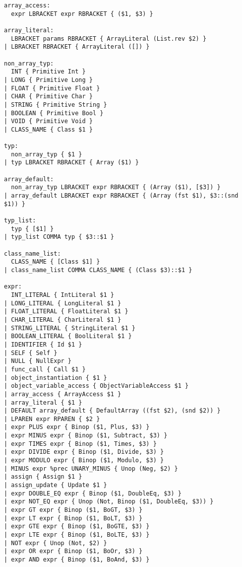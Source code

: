 \documentclass{article}
\begin{document}
\begin{verbatim}
array_access:
  expr LBRACKET expr RBRACKET { ($1, $3) }

array_literal:
  LBRACKET params RBRACKET { ArrayLiteral (List.rev $2) }
| LBRACKET RBRACKET { ArrayLiteral ([]) }

non_array_typ:
  INT { Primitive Int }
| LONG { Primitive Long }
| FLOAT { Primitive Float }
| CHAR { Primitive Char }
| STRING { Primitive String }
| BOOLEAN { Primitive Bool }
| VOID { Primitive Void }
| CLASS_NAME { Class $1 }

typ:
  non_array_typ { $1 }
| typ LBRACKET RBRACKET { Array ($1) }

array_default:
  non_array_typ LBRACKET expr RBRACKET { (Array ($1), [$3]) }
| array_default LBRACKET expr RBRACKET { (Array (fst $1), $3::(snd $1)) }

typ_list:
  typ { [$1] }
| typ_list COMMA typ { $3::$1 }

class_name_list:
  CLASS_NAME { [Class $1] }
| class_name_list COMMA CLASS_NAME { (Class $3)::$1 }

expr:
  INT_LITERAL { IntLiteral $1 }
| LONG_LITERAL { LongLiteral $1 }
| FLOAT_LITERAL { FloatLiteral $1 }
| CHAR_LITERAL { CharLiteral $1 }
| STRING_LITERAL { StringLiteral $1 }
| BOOLEAN_LITERAL { BoolLiteral $1 }
| IDENTIFIER { Id $1 }
| SELF { Self }
| NULL { NullExpr }
| func_call { Call $1 }
| object_instantiation { $1 }
| object_variable_access { ObjectVariableAccess $1 }
| array_access { ArrayAccess $1 }
| array_literal { $1 }
| DEFAULT array_default { DefaultArray ((fst $2), (snd $2)) }
| LPAREN expr RPAREN { $2 }
| expr PLUS expr { Binop ($1, Plus, $3) }
| expr MINUS expr { Binop ($1, Subtract, $3) }
| expr TIMES expr { Binop ($1, Times, $3) }
| expr DIVIDE expr { Binop ($1, Divide, $3) }
| expr MODULO expr { Binop ($1, Modulo, $3) }
| MINUS expr %prec UNARY_MINUS { Unop (Neg, $2) }
| assign { Assign $1 }
| assign_update { Update $1 }
| expr DOUBLE_EQ expr { Binop ($1, DoubleEq, $3) }
| expr NOT_EQ expr { Unop (Not, Binop ($1, DoubleEq, $3)) }
| expr GT expr { Binop ($1, BoGT, $3) }
| expr LT expr { Binop ($1, BoLT, $3) }
| expr GTE expr { Binop ($1, BoGTE, $3) }
| expr LTE expr { Binop ($1, BoLTE, $3) }
| NOT expr { Unop (Not, $2) }
| expr OR expr { Binop ($1, BoOr, $3) }
| expr AND expr { Binop ($1, BoAnd, $3) }
\end{verbatim}
\end{document}
